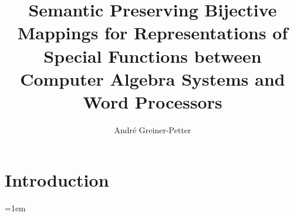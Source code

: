 \documentclass[a4paper,11pt]{article}
\title{
    Semantic Preserving Bijective Mappings for Representations of Special Functions between Computer Algebra Systems and Word Processors
}
\author{Andr\'e Greiner-Petter}
\affil{
	Information Science Group, University of Konstanz, Germany\\
	\url{andre.greiner-petter@t-online.de}
}
\date{} %
\begin{document}
\maketitle

\glsresetall



\section{Introduction}


%
%
%
%

%
%
%
%

%
%
%

%

%

%
%

\emergencystretch=1em
\printbibliography
\end{document}
